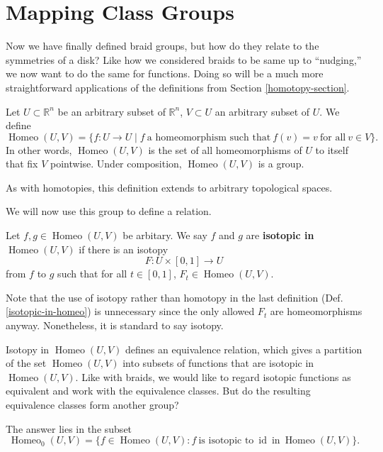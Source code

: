 \documentclass{amsart}
\DeclareMathOperator{\id}{id}
\DeclareMathOperator{\Homeo}{Homeo}
\begin{document}
\section{Mapping Class Groups}\label{mapping-class-groups}
Now we have finally defined braid groups, but how do they relate to the
symmetries of a disk? Like how we considered braids to be same up to
``nudging,'' we now want to do the same for functions. Doing so will be a much
more straightforward applications of the definitions from Section
\ref{homotopy-section}.

\begin{definition}
   Let \(U\subset\mathbb{R}^n\) be an arbitrary subset of \(\mathbb{R}^n\),
	\(V\subset U\) an arbitrary subset of \(U\). We define 
	\[
		\Homeo(U, V) = \{f: U\to U \mid f~\text{a homeomorphism such
		that}~f(v)=v~\text{for all}~v\in V\}.
	\] 
	In other words, \(\Homeo(U, V)\) is the set of all homeomorphisms of
	\(U\) to itself that fix \(V\) pointwise. Under composition, \(\Homeo(U,
	V)\) is a group.
\end{definition}
\begin{remark}
   As with homotopies, this definition extends to arbitrary topological spaces.
\end{remark}

We will now use this group to define a relation.
\begin{definition}\label{isotopic-in-homeo}
	Let \(f, g\in \Homeo(U, V)\) be arbitary. We say \(f\) and \(g\) are
	\textbf{isotopic in \(\Homeo(U, V)\)} if there is an isotopy 
	\[
		F: U\times [0, 1]\to U
	\]
	from \(f\) to \(g\) such that for all \(t\in [0, 1]\),
	\(F_t\in\Homeo(U, V)\).
\end{definition}
Note that the use of isotopy rather than homotopy in the last definition (Def.
\ref{isotopic-in-homeo}) is unnecessary since the only allowed \(F_t\) are
homeomorphisms anyway. Nonetheless, it is standard to say isotopy.

Isotopy in \(\Homeo(U, V)\) defines an equivalence relation, which
gives a partition of the set \(\Homeo(U, V)\) into subsets of functions that are
isotopic in \(\Homeo(U, V)\). Like with braids, we would like to regard
isotopic functions as equivalent and work with the equivalence classes. But do
the resulting equivalence classes form another group?

The answer lies in the subset 
\[
	\Homeo_0(U, V) = \{f\in\Homeo(U, V) : f~\text{is isotopic
	to}~\id~\text{in}~\Homeo(U, V)\}.
\]
\end{document}
